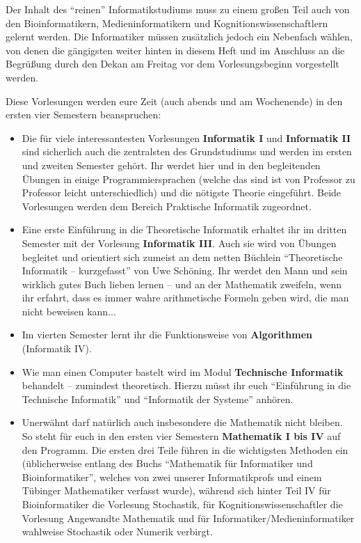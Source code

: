 
Der Inhalt des "`reinen"' Informatikstudiums muss zu einem großen Teil auch von den Bioinformatikern, 
Medieninformatikern und Kognitionswissenschaftlern gelernt werden. Die Informatiker müssen zusätzlich 
jedoch ein Nebenfach wählen, von denen die gängigsten weiter hinten in diesem Heft und im Anschluss 
an die Begrüßung durch den Dekan am Freitag vor dem Vorlesungsbeginn vorgestellt werden.

Diese Vorlesungen werden eure Zeit (auch abends und am Wochenende) in den ersten vier Semestern beanspruchen: 

\begin{itemize}

\item Die für viele interessantesten Vorlesungen \textbf{Informatik I} und \textbf{Informatik II} sind
  sicherlich auch die zentralsten des Grundstudiums und werden im ersten und zweiten
  Semester gehört. Ihr werdet hier und in den begleitenden
  Übungen in einige Programmiersprachen (welche das sind ist von Professor zu Professor
  leicht unterschiedlich) und die nötigste Theorie eingeführt. Beide Vorlesungen werden dem
  Bereich Praktische Informatik zugeordnet.

\item Eine erste Einführung in die Theoretische Informatik erhaltet ihr im dritten Semester
  mit der Vorlesung \textbf{Informatik III}. Auch sie wird von Übungen begleitet und orientiert
  sich zumeist an dem netten Büchlein "`Theoretische Informatik -- kurzgefasst"' von Uwe Schöning.
  Ihr werdet den Mann und sein wirklich gutes Buch lieben lernen -- und an der Mathematik zweifeln,
  wenn ihr erfahrt, dass es immer wahre arithmetische Formeln geben wird, die man nicht beweisen kann...
  
\item Im vierten Semester lernt ihr die Funktionsweise von \textbf{Algorithmen} (Informatik IV).

\item Wie man einen Computer bastelt wird im Modul \textbf{Technische Informatik} behandelt -- 
  zumindest theoretisch. Hierzu müsst ihr euch "`Einführung in die Technische Informatik"' und "`Informatik der Systeme"' anhören.

\item Unerwähnt darf natürlich auch insbesondere die Mathematik nicht bleiben. So steht für
  euch in den ersten vier Semestern \textbf{Mathematik I bis IV} auf den Programm. Die ersten
  drei Teile führen in die wichtigsten Methoden ein (üblicherweise entlang des Buchs "`Mathematik
  für Informatiker und Bioinformatiker"', welches von zwei unserer Informatikprofs und einem
  Tübinger Mathematiker verfasst wurde), während sich hinter Teil IV für Bioinformatiker die Vorlesung 
  Stochastik, für Kognitionswissenschaftler die Vorlesung Angewandte Mathematik und für Informatiker/Medieninformatiker 
  wahlweise Stochastik oder Numerik verbirgt. 


\end{itemize}
